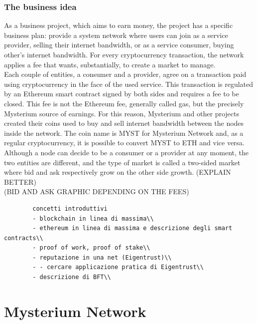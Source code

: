 \documentclass[]{article}
\begin{document}
	\subsubsection{The business idea}
	As a business project, which aims to earn money, the project has a specific business plan: provide a system network where users can join as a service provider, selling their internet bandwidth, or as a service consumer, buying other's internet bandwidth. For every cryptocurrency transaction, the network applies a fee that wants, substantially, to create a market to manage.\\
	Each couple of entities, a consumer and a provider, agree on a transaction paid using cryptocurrency in the face of the used service. This transaction is regulated by an Ethereum smart contract signed by both sides and requires a fee to be closed. This fee is not the Ethereum fee, generally called gas, but the precisely Mysterium source of earnings. For this reason, Mysterium and other projects created their coins used to buy and sell internet bandwidth between the nodes inside the network. The coin name is MYST for Mysterium Network and, as a regular cryptocurrency, it is possible to convert MYST to ETH and vice versa.\\
	Although a node can decide to be a consumer or a provider at any moment, the two entities are different, and the type of market is called a two-sided market where bid and ask respectively grow on the other side growth. (EXPLAIN BETTER)\\

	(BID AND ASK GRAPHIC DEPENDING ON THE FEES)

	\begin{verbatim}
		concetti introduttivi
		- blockchain in linea di massima\\
		- ethereum in linea di massima e descrizione degli smart contracts\\
		- proof of work, proof of stake\\
		- reputazione in una net (Eigentrust)\\
		- - cercare applicazione pratica di Eigentrust\\
		- descrizione di BFT\\
	\end{verbatim}
	
	\section{Mysterium Network}
	
\end{document}
